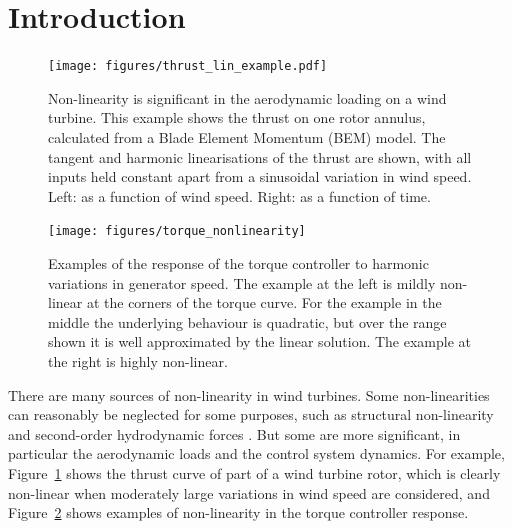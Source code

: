 \documentclass[a4paper,preprint]{elsarticle}
\begin{document}

\section{Introduction}
\label{sec:introduction}

\begin{figure}
  \centering
  \texttt{[image: figures/thrust\_lin\_example.pdf]}
  \caption{Non-linearity is significant in the aerodynamic loading on a wind
    turbine. This example shows the thrust on one rotor annulus, calculated from
    a Blade Element Momentum (BEM) model. The tangent and harmonic
    linearisations of the thrust are shown, with all inputs held constant apart
    from a sinusoidal variation in wind speed. Left: as a function of wind
    speed. Right: as a function of time.}
  \label{fig:thrust}
\end{figure}

\begin{figure}
  \centering
  \texttt{[image: figures/torque\_nonlinearity]}
  \caption{Examples of the response of the torque controller to harmonic
    variations in generator speed. The example at the left is mildly non-linear
    at the corners of the torque curve. For the example in the middle the
    underlying behaviour is quadratic, but over the range shown it is well
    approximated by the linear solution. The example at the right is highly
    non-linear.}
\label{fig:torque-nonlinearity}
\end{figure}

There are many sources of non-linearity in wind turbines. Some non-linearities
can reasonably be neglected for some purposes, such as structural non-linearity
\citep{lupton_complex_2019} and second-order hydrodynamic forces
\citep{lupton_scaling_2017}. But some are more significant, in particular the
aerodynamic loads and the control system dynamics. For example,
Figure~\ref{fig:thrust} shows the thrust curve of part of a wind turbine rotor,
which is clearly non-linear when moderately large variations in wind speed are
considered, and Figure~\ref{fig:torque-nonlinearity} shows examples of
non-linearity in the torque controller response.
\end{document}
